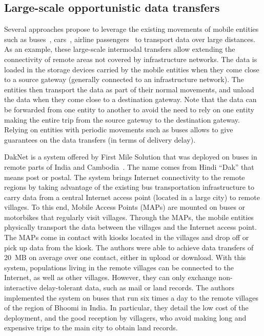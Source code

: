\subsection{Large-scale opportunistic data transfers}

Several approaches propose to leverage the existing movements of mobile entities such as buses~\cite{pentland2004daknet}, cars~\cite{tan2014vehicular}, airline passengers~\cite{keranen2009dtn} to transport data over large distances. As an example, these large-scale intermodal transfers allow extending the connectivity of remote areas not covered by infrastructure networks. The data is loaded in the storage devices carried by the mobile entities when they come close to a source gateway (generally connected to an infrastructure network). The entities then transport the data as part of their normal movements, and unload the data when they come close to a destination gateway. Note that the data can be forwarded from one entity to another to avoid the need to rely on one entity making the entire trip from the source gateway to the destination gateway. Relying on entities with periodic movements such as buses allows to give guarantees on the data transfers (\eg in terms of delivery delay).

DakNet is a system offered by First Mile Solution that was deployed on buses in remote parts of India and Cambodia~\cite{pentland2004daknet}. The name comes from Hindi ``Dak'' that means post or postal. The system brings Internet connectivity to the remote regions by taking advantage of the existing bus transportation infrastructure to carry data from a central Internet access point (located in a large city) to remote villages. To this end, Mobile Access Points (MAPs) are mounted on buses or motorbikes that regularly visit villages. Through the MAPs, the mobile entities physically transport the data between the villages and the Internet access point. The MAPs come in contact with kiosks located in the villages and drop off or pick up data from the kiosk. The authors were able to achieve data transfers of 20~MB on average over one contact, either in upload or download. With this system, populations living in the remote villages can be connected to the Internet, as well as other villages. However, they can only exchange non-interactive delay-tolerant data, such as mail or land records. The authors implemented the system on buses that run six times a day to the remote villages of the region of Bhoomi in India. In particular, they detail the low cost of the deployment, and the good reception by villagers, who avoid making long and expensive trips to the main city to obtain land records.

